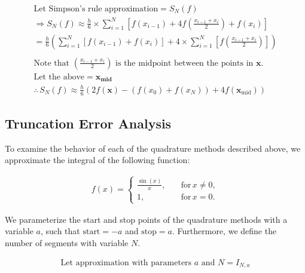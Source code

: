 \documentclass[10pt]{article}
\begin{document}
        \begin{gather*}
            \text{Let Simpson's rule approximation} = S_N(f) \\
            \Rightarrow S_N(f) \approx \frac{h}{6} \times \sum_{i=1}^N \left[ f(x_{i-1}) + 4f \left( \frac{x_{i-1} + x_i}{2} \right) + f(x_i) \right] \\
            = \frac{h}{6} \left( \sum_{i=1}^N [f(x_{i-1}) + f(x_i)] + 4 \times \sum_{i=1}^N \left[ f \left( \frac{x_{i-1} + x_i}{2} \right) \right] \right) \\
            \\
            \text{Note that $\left( \frac{x_{i-1} + x_i}{2} \right)$ is the midpoint between the points in $\boldsymbol{x}$.} \\
            \text{Let the above} = \boldsymbol{x_\text{mid}} \\
            \therefore \, S_N(f) \approx \frac{h}{6} \left( 2f(\boldsymbol{x}) - (f(x_0) + f(x_N)) + 4f(\boldsymbol{x}_\text{mid}) \right)
        \end{gather*}

        
    
    \pagebreak[3]
    \subsection{Truncation Error Analysis} \label{section:q3:trunc_error}

    To examine the behavior of each of the quadrature methods described above, we approximate the integral of the following function:

    \begin{gather*}
        f(x) =
        \begin{cases}
            \frac{\sin{(x)}}{x}, & \quad \text{for} \, x \neq 0, \\
            1, & \quad \text{for} \, x = 0.
        \end{cases}
    \end{gather*}

    We parameterize the start and stop points of the quadrature methods with a variable $a$, such that ${\text{start} = -a}$ and ${\text{stop} = a}$. Furthermore, we define the number of segments with variable $N$.

    \begin{gather*}
        \text{Let approximation with parameters $a$ and $N$} = I_{N,a}
    \end{gather*}
\end{document}

